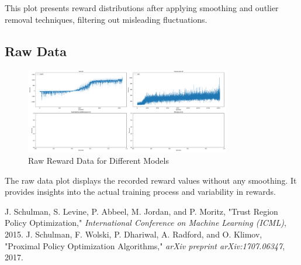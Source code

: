 \documentclass{article}
\begin{document}
This plot presents reward distributions after applying smoothing and outlier removal techniques, filtering out misleading fluctuations.

\subsection*{Raw Data}

\begin{figure}[H]
    \centering
    \includegraphics[width=0.8\textwidth]{.assets/raw_data.png}
    \caption{Raw Reward Data for Different Models}
\end{figure}

The raw data plot displays the recorded reward values without any smoothing. It provides insights into the actual training process and variability in rewards.

\begin{thebibliography}{9}
 J. Schulman, S. Levine, P. Abbeel, M. Jordan, and P. Moritz, "Trust Region Policy Optimization," \textit{International Conference on Machine Learning (ICML)}, 2015.
 J. Schulman, F. Wolski, P. Dhariwal, A. Radford, and O. Klimov, "Proximal Policy Optimization Algorithms," \textit{arXiv preprint arXiv:1707.06347}, 2017.
\end{thebibliography}
\end{document}
